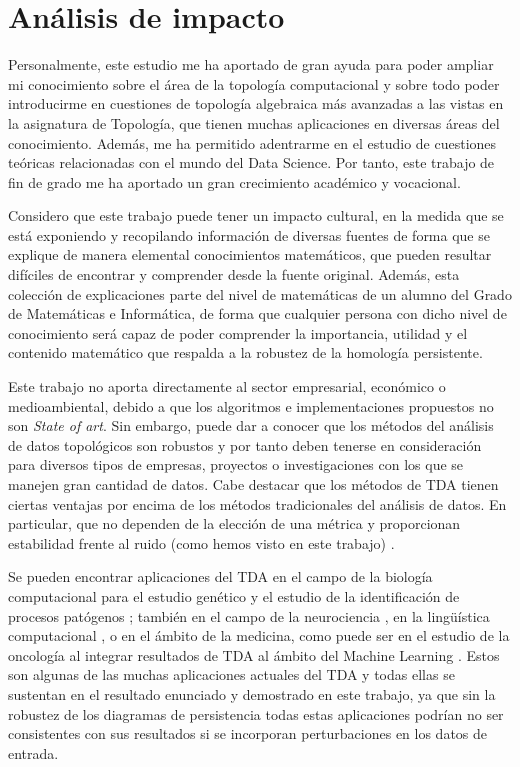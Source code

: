 \chapter{Análisis de impacto}

Personalmente, este estudio me ha aportado de gran ayuda para poder ampliar mi conocimiento sobre el área de la topología computacional y sobre todo poder introducirme en cuestiones de topología algebraica más avanzadas a las vistas en la asignatura de Topología, que tienen muchas aplicaciones en diversas áreas del conocimiento. Además, me ha permitido adentrarme en el estudio de cuestiones teóricas relacionadas con el mundo del Data Science. Por tanto, este trabajo de fin de grado me ha aportado un gran crecimiento académico y vocacional.

Considero que este trabajo puede tener un impacto cultural, en la medida que se está exponiendo y recopilando información de diversas fuentes de forma que se explique de manera elemental conocimientos matemáticos, que pueden resultar difíciles de encontrar y comprender desde la fuente original. Además, esta colección de explicaciones parte del nivel de matemáticas de un alumno del Grado de Matemáticas e Informática, de forma que cualquier persona con dicho nivel de conocimiento será capaz de poder comprender la importancia, utilidad y el contenido matemático que respalda a la robustez de la homología persistente.

Este trabajo no aporta directamente al sector empresarial, económico o medioambiental, debido a que los algoritmos e implementaciones propuestos no son \emph{State of art}. Sin embargo, puede dar a conocer que los métodos del análisis de datos topológicos son robustos y por tanto deben tenerse en consideración para diversos tipos de empresas, proyectos o investigaciones con los que se manejen gran cantidad de datos. Cabe destacar que los métodos de TDA tienen ciertas ventajas por encima de los métodos tradicionales del análisis de datos. En particular, que no dependen de la elección de una métrica y proporcionan estabilidad frente al ruido (como hemos visto en este trabajo) \cite{tdaIBM}.  

Se pueden encontrar aplicaciones del TDA en el campo de la biología computacional para el estudio genético y el estudio de la identificación de procesos patógenos \cite{biologia}; también en el campo de la neurociencia \cite{neuronas}, en la lingüística computacional \cite{linguistica}, o en el ámbito de la medicina, como puede ser en el estudio de la oncología al integrar resultados de TDA al ámbito del Machine Learning \cite{oncologia}. Estos son algunas de las muchas aplicaciones actuales del TDA y todas ellas se sustentan en el resultado enunciado y demostrado en este trabajo, ya que sin la robustez de los diagramas de persistencia todas estas aplicaciones podrían no ser consistentes con sus resultados si se incorporan perturbaciones en los datos de entrada.